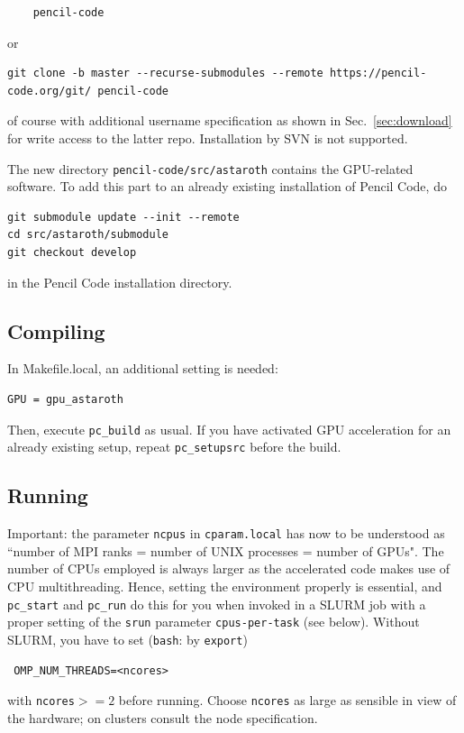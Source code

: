 \documentclass[a4paper,12pt]{article}
\newcommand{\command}[1]{\texttt{#1}}
\newcommand{\code}[1]{\texttt{#1}}
\begin{document}
\vspace{-2mm}
\begin{verbatim}
    pencil-code
\end{verbatim}
or
\begin{verbatim}
git clone -b master --recurse-submodules --remote https://pencil-code.org/git/ pencil-code
\end{verbatim}
of course with additional username specification as shown in Sec.~\ref{sec:download} for write access to the latter repo.
Installation by SVN is not supported.

The new directory
\code{pencil-code/src/astaroth} contains the GPU-related software.
To add this part to an already existing installation of Pencil Code, do
\begin{verbatim}
git submodule update --init --remote
cd src/astaroth/submodule
git checkout develop
\end{verbatim}
in the Pencil Code installation directory.

\subsection{Compiling}
In Makefile.local,  an additional setting is needed:
\begin{verbatim}
GPU = gpu_astaroth
\end{verbatim}

Then, execute \command{pc\_build} as usual.
If you have activated GPU acceleration for an already existing setup, repeat \command{pc\_setupsrc} before the build.

\subsection{Running}
Important: the parameter \command{ncpus} in \command{cparam.local} has now to be understood as ``number of MPI ranks = number of UNIX processes = number of GPUs". The number of CPUs employed is always larger  as
the accelerated code makes use of CPU multithreading. Hence, setting the environment properly is essential, and \command{pc\_start} and \command{pc\_run} do this for you when invoked in a SLURM job with a proper setting of the \code{srun} parameter \code{cpus-per-task} (see below). Without SLURM, you have to set
(\code{bash}: by \command{export})
\begin{verbatim}
 OMP_NUM_THREADS=<ncores>
\end{verbatim}
with \command{ncores}$ >=2$ before running.
Choose \command{ncores} as large as sensible in view of the hardware; on clusters consult the node specification.
\end{document}
